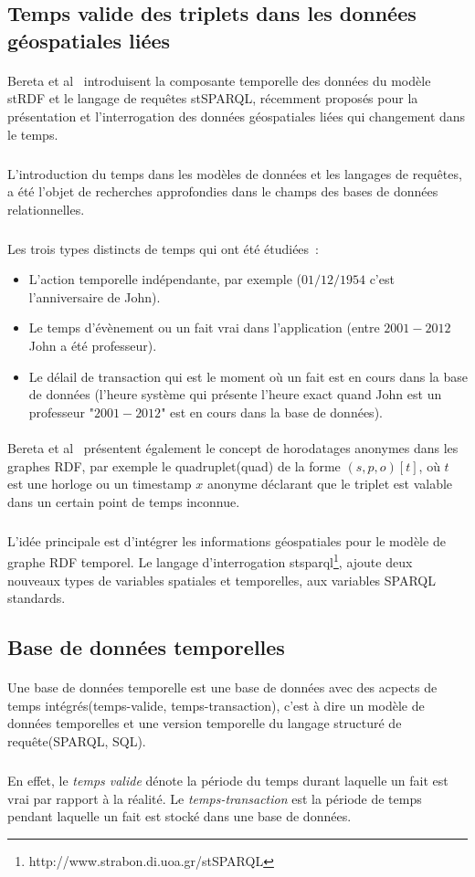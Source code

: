 \documentclass[12pt,a4	]{report}
\begin{document}
\subsection*{Temps valide des triplets dans les données géospatiales liées}
\paragraph{}
Bereta et al~\cite{bereta2013} introduisent la composante temporelle des données du modèle stRDF et le langage de requêtes stSPARQL, récemment proposés pour la présentation et l’interrogation des données géospatiales liées qui changement dans le temps.
\subparagraph{}
L’introduction du temps dans les modèles de données et les langages de requêtes, a été l’objet de recherches approfondies dans le champs des bases de données relationnelles.
\subparagraph{}
Les trois types distincts de temps qui ont été  étudiées~:
\begin{itemize}
\item L'action temporelle indépendante, par exemple ($01/12/1954$ c’est l’anniversaire de John).
\item Le temps d’évènement ou un fait vrai dans l’application (entre $2001-2012$ John a été professeur).
\item Le délail de transaction qui est le moment où un fait est en cours dans la base de données (l’heure système qui présente l’heure exact quand John est un professeur "$2001-2012$" est en cours dans la base de données).
\end{itemize}
\paragraph{}
Bereta et al~\cite{bereta2013} présentent également le concept de horodatages anonymes dans les graphes RDF, par exemple le quadruplet(quad) de la forme $(s, p, o)[t]$, où $t$ est une horloge ou un timestamp $x$ anonyme déclarant que le triplet est valable dans un certain point de temps inconnue.
\subparagraph{}
L’idée principale est d’intégrer les informations géospatiales pour le modèle de graphe RDF temporel. Le langage d’interrogation \gls{stsparql}\footnote{http://www.strabon.di.uoa.gr/stSPARQL}, ajoute deux nouveaux types de variables spatiales et temporelles, aux variables SPARQL standards.
\subsection*{Base de données temporelles}
\paragraph{}
Une base de données temporelle est une base de données avec des acpects de temps intégrés(temps-valide, temps-transaction), c'est à dire un modèle de données temporelles et une version temporelle du langage structuré de requête(SPARQL, SQL).
\subparagraph{}
En effet, le \textit{temps valide} dénote la période du temps durant laquelle un fait est vrai par rapport à la réalité.
Le \textit{temps-transaction} est la période de temps pendant laquelle un fait est stocké dans une base de données.
\end{document}
